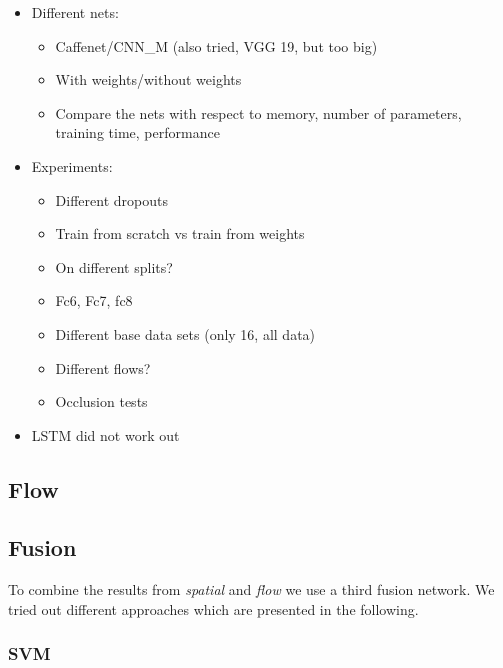 \begin{itemize}
	\item
		Different nets:
		\begin{itemize}
			\item Caffenet/CNN\_M (also tried, VGG 19, but too big)
			\item With weights/without weights
			\item Compare the nets with respect to memory, number of parameters, training time, performance
		\end{itemize}
	\item
		Experiments:
		\begin{itemize}
			\item Different dropouts
			\item Train from scratch vs train from weights
			\item On different splits?
			\item Fc6, Fc7, fc8
			\item Different base data sets (only 16, all data)
			\item Different flows?
			\item Occlusion tests
		\end{itemize}
	\item
		LSTM did not work out
\end{itemize}


\subsection{Flow}
\label{subsec:flow}



\subsection{Fusion}
\label{subsec:fusion}

To combine the results from \emph{spatial} and \emph{flow} we use a third fusion network.
We tried out different approaches which are presented in the following.

\subsubsection{SVM}

